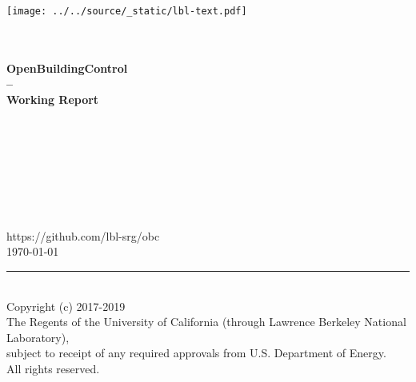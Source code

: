 \begin{titlepage}
\begin{minipage}{\headwidth}
\begin{flushright}
\texttt{[image: ../../source/\_static/lbl-text.pdf]}
\end{flushright}
\begin{flushright}
\vspace{-1cm}
\large{~}
\\[5mm]
\hrulefill
\\[5mm]
 \Large\sffamily\bfseries{OpenBuildingControl}\\
 \Large\sffamily\bfseries{--}\\[3mm]
 \Large\sffamily\bfseries{Working Report}\\
 \Large\sffamily\bfseries{~}
\\
\hrulefill
~\\[30mm]
\end{flushright}
\begin{center}
\large{~}\\
\large{~}\\
\large{~}\\
\large{~}\\
\large{~}\\
\large{https://github.com/lbl-srg/obc}
~\\[30mm]
\large{\today}
\\[30mm]
\end{center}
\hrule
~\\[2mm]
Copyright (c) 2017-2019\\
The Regents of the University of California
(through Lawrence Berkeley National Laboratory),\\
subject to receipt of any required approvals from U.S. Department of Energy.\\
All rights reserved.
\end{minipage}
\end{titlepage}
